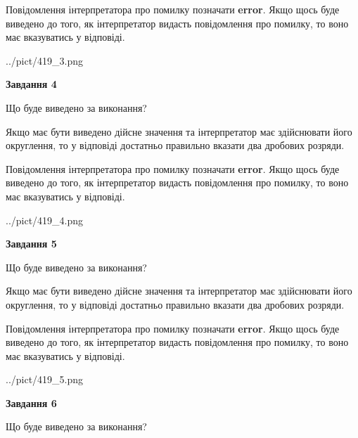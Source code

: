 \documentclass[12pt, ukrainian]{article}
\begin{document}
{\begin {Large}
Повідомлення інтерпретатора про помилку позначати \textbf{error}.
Якщо щось буде виведено до того, як інтерпретатор видасть повідомлення про помилку, 
то воно має вказуватись у відповіді. \par

\begin{center}
	{../pict/419_3.png}
\end{center}
\newpage

{\begin {center}\textbf{Завдання 4}\end {center}}\par
Що буде виведено за виконання? \par

Якщо має бути виведено дійсне значення та інтерпретатор має здійснювати його округлення, 
то у відповіді достатньо правильно вказати два дробових розряди.

Повідомлення інтерпретатора про помилку позначати \textbf{error}.
Якщо щось буде виведено до того, як інтерпретатор видасть повідомлення про помилку, 
то воно має вказуватись у відповіді. \par

\begin{center}
	{../pict/419_4.png}
\end{center}
\newpage

{\begin {center}\textbf{Завдання 5}\end {center}}\par
Що буде виведено за виконання? \par

Якщо має бути виведено дійсне значення та інтерпретатор має здійснювати його округлення, 
то у відповіді достатньо правильно вказати два дробових розряди.

Повідомлення інтерпретатора про помилку позначати \textbf{error}.
Якщо щось буде виведено до того, як інтерпретатор видасть повідомлення про помилку, 
то воно має вказуватись у відповіді. \par

\begin{center}
	{../pict/419_5.png}
\end{center}
\newpage

{\begin {center}\textbf{Завдання 6}\end {center}}\par
Що буде виведено за виконання? \par


\end{Large}}
\end{document}
